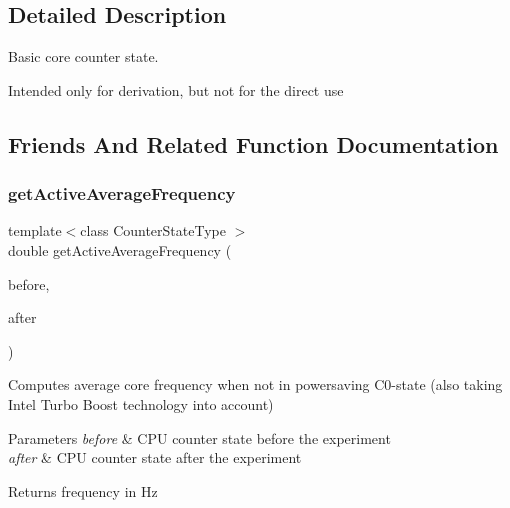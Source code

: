 \subsection{Detailed Description}
Basic core counter state. 

Intended only for derivation, but not for the direct use 

\subsection{Friends And Related Function Documentation}
\mbox{\label{classBasicCounterState_a963d78be64ccddb4f7686405ef4df9c1}} 
\subsubsection{get\+Active\+Average\+Frequency}
{\footnotesize\ttfamily template$<$class Counter\+State\+Type $>$ \\
double get\+Active\+Average\+Frequency (\begin{DoxyParamCaption}\item[{const Counter\+State\+Type \&}]{before,  }\item[{const Counter\+State\+Type \&}]{after }\end{DoxyParamCaption})\hspace{0.3cm}{\ttfamily [friend]}}



Computes average core frequency when not in powersaving C0-\/state (also taking Intel Turbo Boost technology into account) 


\begin{DoxyParams}{Parameters}
{\em before} & C\+PU counter state before the experiment \\
\hline
{\em after} & C\+PU counter state after the experiment \\
\hline
\end{DoxyParams}
\begin{DoxyReturn}{Returns}
frequency in Hz 
\end{DoxyReturn}
\mbox{\label{classBasicCounterState_a9a351e598b8af26131611ff37b592633}} 
